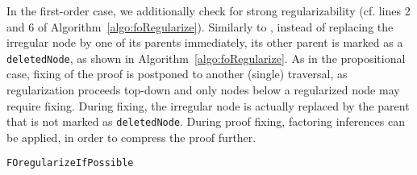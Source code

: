 In the first-order case, we additionally check for strong regularizability (cf. lines 2 and 6 of Algorithm~\ref{algo:foRegularize}).
Similarly to {\RPI}, instead of replacing the irregular node by one of its parents immediately, 
its other parent is marked as a \texttt{deletedNode}, as shown in Algorithm~\ref{algo:foRegularize}.
As in the propositional case, fixing of the proof is postponed to another (single) traversal, as regularization proceeds top-down and only nodes below a regularized node may require fixing.
During fixing, the irregular node is actually replaced by the parent that is not marked as \texttt{deletedNode}. During proof fixing, factoring inferences can be applied, in order to compress the proof further.


\begin{algorithm}[bt]
\begin{footnotesize}



\BlankLine
\caption{\label{algo:foRegularize} \texttt{FOregularizeIfPossible}}
\end{footnotesize}
\end{algorithm}


